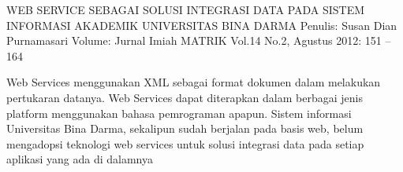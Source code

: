 \documentclass[12pt, times new roman, a4paper] {article}
\begin{document}
WEB SERVICE SEBAGAI SOLUSI INTEGRASI DATA PADA SISTEM INFORMASI AKADEMIK UNIVERSITAS BINA DARMA
Penulis: Susan Dian Purnamasari
Volume: Jurnal Imiah MATRIK Vol.14 No.2, Agustus 2012: 151 – 164

Web Services menggunakan XML sebagai format dokumen dalam melakukan pertukaran datanya. Web Services dapat diterapkan dalam berbagai jenis platform menggunakan bahasa pemrograman apapun. Sistem informasi Universitas Bina Darma, sekalipun sudah berjalan pada basis web, belum mengadopsi teknologi web services untuk solusi integrasi data pada setiap aplikasi yang ada di dalamnya
\end{document}
